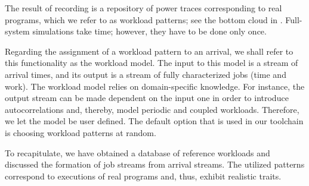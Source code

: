 The result of recording is a repository of power traces corresponding to real
programs, which we refer to as workload patterns; see the bottom cloud in
. Full-system simulations take time; however, they have to be
done only once.

Regarding the assignment of a workload pattern to an arrival, we shall refer to
this functionality as the workload model. The input to this model is a stream of
arrival times, and its output is a stream of fully characterized jobs (time and
work). The workload model relies on domain-specific knowledge. For instance, the
output stream can be made dependent on the input one in order to introduce
autocorrelations and, thereby, model periodic and coupled workloads. Therefore,
we let the model be user defined. The default option that is used in our
toolchain is choosing workload patterns at random.

To recapitulate, we have obtained a database of reference workloads and
discussed the formation of job streams from arrival streams. The utilized
patterns correspond to executions of real programs and, thus, exhibit realistic
traits.
